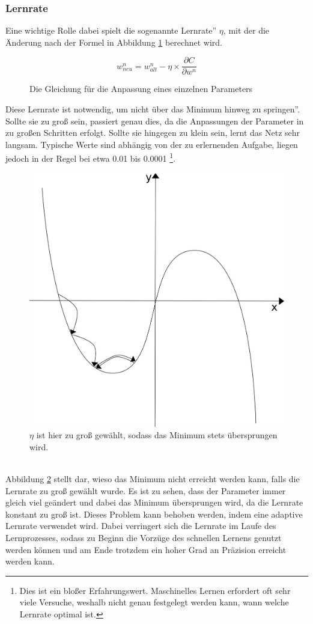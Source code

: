\documentclass[11pt]{article}
\begin{document}
\subsubsection{Lernrate}
Eine wichtige Rolle dabei spielt die sogenannte \glqq Lernrate'' $\eta$, mit der die Änderung nach der Formel in Abbildung \ref{Learning_Rate_Function} berechnet wird.
\begin{figure}[h]
	\begin{equation*}
	w^n_{neu}=w^n_{alt}-\eta\times\frac{\partial C}{\partial w^n}
	\end{equation*}
	\caption{Die Gleichung für die Anpassung eines einzelnen Parameters}
	\label{Learning_Rate_Function}
\end{figure}
\newline
Diese Lernrate ist notwendig, um nicht über das Minimum \glqq hinweg zu springen''. Sollte sie zu groß sein, passiert genau dies, da die Anpassungen der Parameter in zu großen Schritten erfolgt. Sollte sie hingegen zu klein sein, lernt das Netz sehr langsam. Typische Werte sind abhängig von der zu erlernenden Aufgabe, liegen jedoch in der Regel bei etwa 0.01 bis 0.0001 \footnote{Dies ist ein bloßer Erfahrungswert. Maschinelles Lernen erfordert oft sehr viele Versuche, weshalb nicht genau festgelegt werden kann, wann welche Lernrate optimal ist.}.
\begin{figure}[h]
	\begin{center}
		\includegraphics[width=0.4\linewidth]{../graphics/gdf_big_lr.png}
	\end{center}
	\caption{$\eta$ ist hier zu groß gewählt, sodass das Minimum stets übersprungen wird.}
	\label{Learning_Rate_Graphic}
\end{figure}
\\
Abbildung \ref{Learning_Rate_Graphic} stellt dar, wieso das Minimum nicht erreicht werden kann, falls die Lernrate zu groß gewählt wurde. Es ist zu sehen, dass der Parameter immer gleich viel geändert und dabei das Minimum übersprungen wird, da die Lernrate konstant zu groß ist. Dieses Problem kann behoben werden, indem eine adaptive Lernrate verwendet wird. Dabei verringert sich die Lernrate im Laufe des Lernprozesses, sodass zu Beginn die Vorzüge des schnellen Lernens genutzt werden können und am Ende trotzdem ein hoher Grad an Präzision erreicht werden kann.
\end{document}
